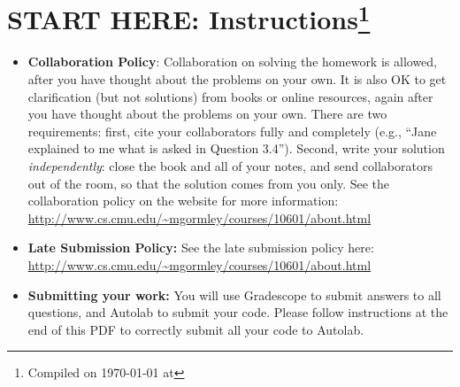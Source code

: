 \documentclass{article}
\begin{document}
\section*{START HERE: Instructions\footnote{Compiled on \today{} at \currenttime{}}}
\begin{itemize}

\item \textbf{Collaboration Policy}: Collaboration on solving the homework is allowed, after you have thought about the problems on your own. It is also OK to get clarification (but not solutions) from books or online resources, again after you have thought about the problems on your own. There are two requirements: first, cite your collaborators fully and completely (e.g., ``Jane explained to me what is asked in Question 3.4''). Second, write your solution {\em independently}: close the book and all of your notes, and send collaborators out of the room, so that the solution comes from you only.  See the collaboration policy on the website for more information: \url{http://www.cs.cmu.edu/~mgormley/courses/10601/about.html}
\item\textbf{Late Submission Policy:} See the late submission policy
  here:
  \url{http://www.cs.cmu.edu/~mgormley/courses/10601/about.html}

\item\textbf{Submitting your work:} You will use Gradescope to submit
  answers to all questions, and Autolab to submit your code. Please
  follow instructions at the end of this PDF to correctly submit all your code to Autolab.

  \begin{itemize}
    

    

\end{itemize}
\end{itemize}
\end{document}
